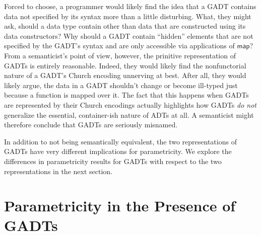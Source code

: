 \documentclass[submission,copyright,creativecommons]{eptcs}
\begin{document}
Forced to choose, a programmer would likely find the idea that a GADT
contains data not specified by its syntax more than a little
disturbing. What, they might ask, should a data type contain other
than data that are constructed using its data constructors? Why should
a GADT contain ``hidden'' elements that are not specified by the
GADT's syntax and are only accessible via applications of
$\mathsf{map}$? From a semanticist's point of view, however, the
prinitive representation of GADTs is entirely reasonable. Indeed, they
would likely find the nonfunctorial nature of a GADT's Church encoding
unnerving at best. After all, they would likely argue, the data in a
GADT shouldn't change or become ill-typed just because a function is
mapped over it. The fact that this happens when GADTs are represented
by their Church encodings actually highlights how GADTs {\em do not}
generalize the essential, container-ish nature of ADTs at all. A
semanticist might therefore conclude that GADTs are seriously
misnamed.

\begin{comment}
The reader familiar with {\color{red} short cut fusion} will quickly
see that the non-uniform nature of GADTs that are not nested types
entails that short cut fusion cannot be validated for their Church
encodings. In fact, it is not even possible to define a
$\mathsf{build}$ function, which is a crucial ingredient in short cut
fusion, for the Church encoding of a GADT that is not a nested
type. But the fact that not all of the elements in the functorial
completion of a GADT that is not a nested type are directly
representable as applications of data constructors means that it is
also impossible to define a $\mathsf{build}$ function for the fixpoint
representation of such a GADT. Ultimately this is not surprising,
though: if short cut fusion were to hold for a GADT then its Church
encoding and {\color{red} fixpoint} primitive representation would
necessarily be semantically equivalent.
\end{comment}

In addition to not being semantically equivalent, the two
representations of GADTs have very different implications for
parametricity. We explore the differences in parametricity results for
GADTs with respect to the two representations in the next section.

\section{Parametricity in the Presence of GADTs}\label{sec:par}
\end{document}

